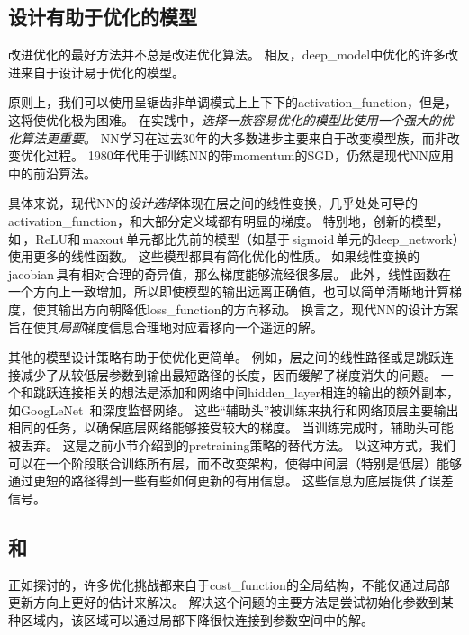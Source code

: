 
\subsection{设计有助于优化的模型}
\label{sec:designing_models_to_aid_optimization}
改进优化的最好方法并不总是改进优化算法。
相反，\gls{deep_model}中优化的许多改进来自于设计易于优化的模型。

原则上，我们可以使用呈锯齿非单调模式上上下下的\gls{activation_function}，但是，这将使优化极为困难。
在实践中，\emph{选择一族容易优化的模型比使用一个强大的优化算法更重要}。
\gls{NN}学习在过去30年的大多数进步主要来自于改变模型族，而非改变优化过程。
1980年代用于训练\gls{NN}的带\gls{momentum}的\gls{SGD}，仍然是现代\gls{NN}应用中的前沿算法。

具体来说，现代\gls{NN}的\emph{设计选择}体现在层之间的线性变换，几乎处处可导的\gls{activation_function}，和大部分定义域都有明显的梯度。
特别地，创新的模型，如\,，\gls{ReLU}和\,\gls{maxout}\,单元都比先前的模型（如基于\,\gls{sigmoid}\,单元的\gls{deep_network}）使用更多的线性函数。
这些模型都具有简化优化的性质。
如果线性变换的\,\gls{jacobian}\,具有相对合理的奇异值，那么梯度能够流经很多层。
此外，线性函数在一个方向上一致增加，所以即使模型的输出远离正确值，也可以简单清晰地计算梯度，使其输出方向朝降低\gls{loss_function}的方向移动。
换言之，现代\gls{NN}的设计方案旨在使其\emph{局部}梯度信息合理地对应着移向一个遥远的解。

其他的模型设计策略有助于使优化更简单。
例如，层之间的线性路径或是跳跃连接减少了从较低层参数到输出最短路径的长度，因而缓解了梯度消失的问题\citep{Srivastava-et-al-arxiv2015}。
一个和跳跃连接相关的想法是添加和网络中间\gls{hidden_layer}相连的输出的额外副本，如GoogLeNet~\citep{Szegedy-et-al-arxiv2014}和深度监督网络\citep{Lee-et-al-2014}。
这些``辅助头''被训练来执行和网络顶层主要输出相同的任务，以确保底层网络能够接受较大的梯度。
当训练完成时，辅助头可能被丢弃。
这是之前小节介绍到的\gls{pretraining}策略的替代方法。
以这种方式，我们可以在一个阶段联合训练所有层，而不改变架构，使得中间层（特别是低层）能够通过更短的路径得到一些有些如何更新的有用信息。
这些信息为底层提供了误差信号。


\subsection{和}
\label{sec:continuation_methods_and_curriculum_learning}
正如探讨的，许多优化挑战都来自于\gls{cost_function}的全局结构，不能仅通过局部更新方向上更好的估计来解决。
解决这个问题的主要方法是尝试初始化参数到某种区域内，该区域可以通过局部下降很快连接到参数空间中的解。


